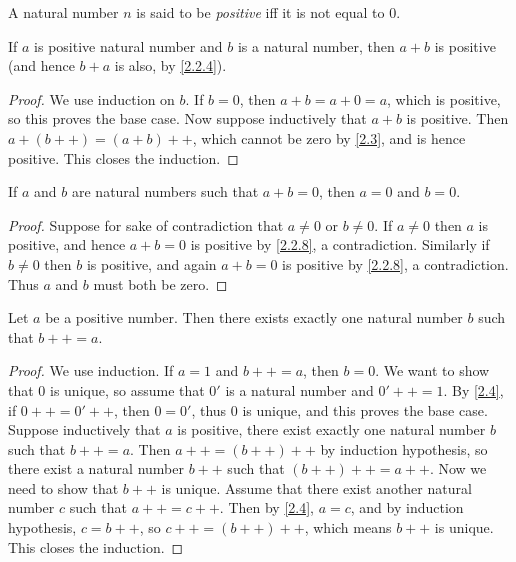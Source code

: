\begin{defn}\label{2.2.7}
  A natural number \(n\) is said to be \emph{positive} iff it is not equal to \(0\).
\end{defn}

\begin{prop}\label{2.2.8}
  If \(a\) is positive natural number and \(b\) is a natural number, then \(a + b\) is positive (and hence \(b + a\) is also, by \cref{2.2.4}).
\end{prop}

\begin{proof}
  We use induction on \(b\).
  If \(b = 0\), then \(a + b = a + 0 = a\), which is positive, so this proves the base case.
  Now suppose inductively that \(a + b\) is positive.
  Then \(a + (b++) = (a + b)++\), which cannot be zero by \cref{2.3}, and is hence positive.
  This closes the induction.
\end{proof}

\begin{cor}\label{2.2.9}
  If \(a\) and \(b\) are natural numbers such that \(a + b = 0\), then \(a = 0\) and \(b = 0\).
\end{cor}

\begin{proof}
  Suppose for sake of contradiction that \(a \neq 0\) or \(b \neq 0\).
  If \(a \neq 0\) then \(a\) is positive, and hence \(a + b = 0\) is positive by \cref{2.2.8}, a contradiction.
  Similarly if \(b \neq 0\) then \(b\) is positive, and again \(a + b = 0\) is positive by \cref{2.2.8}, a contradiction.
  Thus \(a\) and \(b\) must both be zero.
\end{proof}

\begin{lem}\label{2.2.10}
  Let \(a\) be a positive number.
  Then there exists exactly one natural number \(b\) such that \(b++ = a\).
\end{lem}

\begin{proof}
  We use induction.
  If \(a = 1\) and \(b++ = a\), then \(b = 0\).
  We want to show that \(0\) is unique, so assume that \(0'\) is a natural number and \(0'++ = 1\).
  By \cref{2.4}, if \(0++ = 0'++\), then \(0 = 0'\), thus \(0\) is unique, and this proves the base case.
  Suppose inductively that \(a\) is positive, there exist exactly one natural number \(b\) such that \(b++ = a\).
  Then \(a++ = (b++)++\) by induction hypothesis, so there exist a natural number \(b++\) such that \((b++)++ = a++\).
  Now we need to show that \(b++\) is unique.
  Assume that there exist another natural number \(c\) such that \(a++ = c++\).
  Then by \cref{2.4}, \(a = c\), and by induction hypothesis, \(c = b++\), so \(c++ = (b++)++\), which means \(b++\) is unique.
  This closes the induction.
\end{proof}

